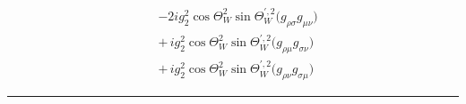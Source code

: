 \begin{align} 
 &-2 i g_{2}^{2} \cos\Theta_{W }^{2} \sin\Theta_{W}^{\prime,2} \Big(g_{\rho \sigma} g_{\mu \nu} \Big)\\ 
  & + \,i g_{2}^{2} \cos\Theta_{W }^{2} \sin\Theta_{W}^{\prime,2} \Big(g_{\rho \mu} g_{\sigma \nu} \Big)\\ 
  & + \,i g_{2}^{2} \cos\Theta_{W }^{2} \sin\Theta_{W}^{\prime,2} \Big(g_{\rho \nu} g_{\sigma \mu} \Big)\end{align} 
\hrule 

